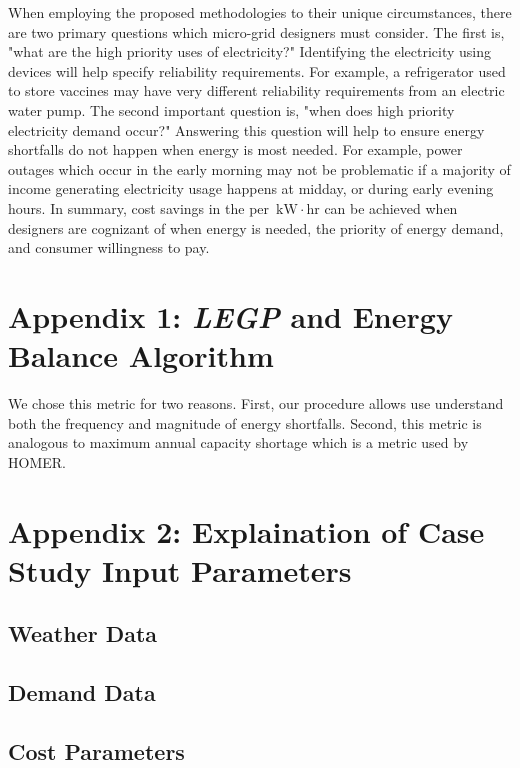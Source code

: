 \documentclass[11p]{article}
\newcommand{\unit}[1]{\ensuremath{\, \mathrm{#1}}}
\begin{document}
When employing the proposed methodologies to their unique circumstances, there are two primary questions which micro-grid designers must consider.
The first is, "what are the high priority uses of electricity?"
Identifying the electricity using devices will help specify reliability requirements.
For example, a refrigerator used to store vaccines may have very different reliability requirements from an electric water pump. 
The second important question is, "when does high priority electricity demand occur?"
Answering this question will help to ensure energy shortfalls do not happen when energy is most needed.
For example, power outages which occur in the early morning may not be problematic if a majority of income generating electricity usage happens at midday, or during early evening hours. 
In summary, cost savings in the per \unit{kW \! \cdot \! hr} can be achieved when designers are cognizant of when energy is needed, the priority of energy demand, and consumer willingness to pay. 










\appendix	
\section{Appendix 1: \emph{LEGP} and Energy Balance Algorithm} \label{A1}

We chose this metric for two reasons.
First, our procedure allows use understand both the frequency and magnitude of energy shortfalls. 
Second, this metric is analogous to maximum annual capacity shortage which is a metric used by HOMER.


\section{Appendix 2: Explaination of Case Study Input Parameters} \label{A2}

\subsection{Weather Data}
\subsection{Demand Data}
\subsection{Cost Parameters}
\end{document}
